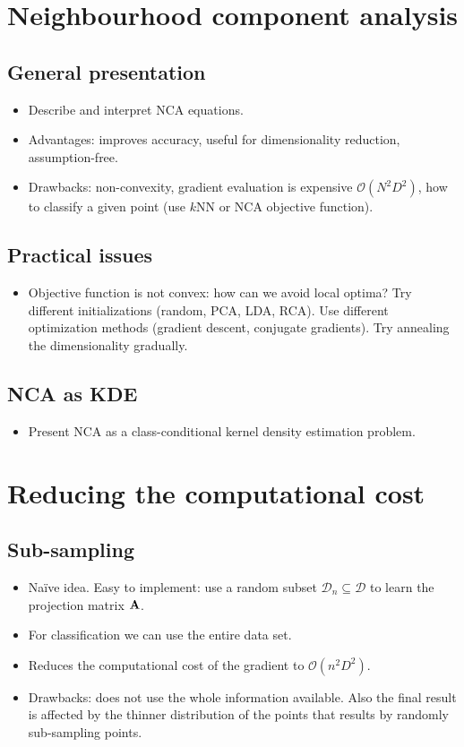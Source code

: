 \documentclass[11pt]{article} %
\begin{document}
\section{Neighbourhood component analysis}
	\subsection{General presentation}
		\begin{itemize}
			\item Describe and interpret NCA equations.
			\item Advantages: improves accuracy, useful for dimensionality reduction, assumption-free.
			\item Drawbacks: non-convexity, gradient evaluation is expensive $\mathcal{O}(N^2D^2)$, how to classify a given point (use $k$NN or NCA objective function).
		\end{itemize}
	\subsection{Practical issues}
		\begin{itemize}
			\item Objective function is not convex: how can we avoid local optima? Try different initializations (random, PCA, LDA, RCA). Use different optimization methods (gradient descent, conjugate gradients). Try annealing the dimensionality gradually.
		\end{itemize}
	\subsection{NCA as KDE}
		\begin{itemize}
			\item Present NCA as a class-conditional kernel density estimation problem. 
		\end{itemize}
		
\section{Reducing the computational cost}
	\subsection{Sub-sampling}
		\begin{itemize}
			\item Na\"ive idea. Easy to implement: use a random subset $\mathcal{D}_n\subseteq \mathcal{D}$ to learn the projection matrix $\mathbf{A}$.
			\item For classification we can use the entire data set.
			\item Reduces the computational cost of the gradient to $\mathcal{O}(n^2D^2)$.
			\item Drawbacks: does not use the whole information available. Also the final result is affected by the thinner distribution of the points that results by randomly sub-sampling points.
		\end{itemize}
\end{document}
